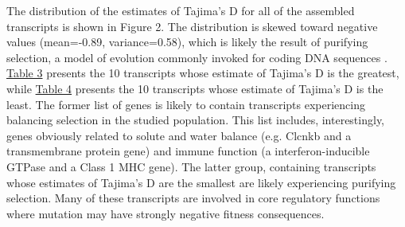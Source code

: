 \documentclass[11pt]{article}
\begin{document}
The distribution of the estimates of Tajima's D for all of the assembled transcripts is shown in Figure 2. The distribution is skewed toward negative values (mean=-0.89, variance=0.58), which is likely the result of purifying selection, a model of evolution commonly invoked for coding DNA sequences \cite{Chamary:2006db}. \hyperlink{Table 3}{Table 3} presents the 10 transcripts whose estimate of Tajima's D is the greatest, while \hyperlink{Table 4}{Table 4} presents the 10 transcripts whose estimate of Tajima's D is the least. The former list of genes is likely to contain transcripts experiencing balancing selection in the studied population. This list includes, interestingly, genes obviously related to solute and water balance (e.g. Clcnkb and a transmembrane protein gene) and immune function (a interferon-inducible GTPase and a Class 1 MHC gene). The latter group, containing transcripts whose estimates of Tajima's D are the smallest are likely experiencing purifying selection. Many of these transcripts are involved in core regulatory functions where mutation may have strongly negative fitness consequences. \\

\vspace{10mm}
\end{document}
